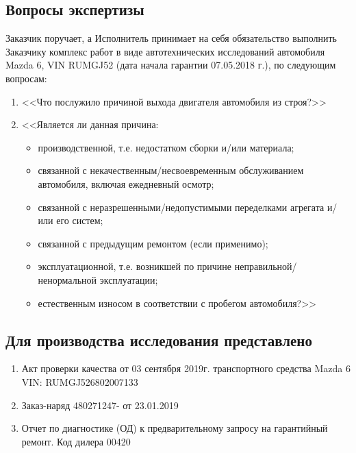 \setcounter{page}{1}

%
%
\subsection{Вопросы экспертизы}
Заказчик поручает, а Исполнитель принимает на себя обязательство выполнить Заказчику  комплекс работ в виде автотехнических исследований автомобиля Mazda 6, VIN RUMGJ52 (дата начала гарантии 07.05.2018 г.), по следующим вопросам:
\begin{enumerate}\item  <<Что послужило причиной выхода двигателя автомобиля из строя?>>	
	\item  <<Является ли данная причина:\begin{itemize}
		\item производственной, т.е. недостатком сборки и/или материала;
	\item связанной с некачественным/несвоевременным обслуживанием автомобиля, включая ежедневный осмотр;
\item связанной с неразрешенными/недопустимыми переделками агрегата и/или его систем;
\item связанной с предыдущим ремонтом (если применимо);
\item эксплуатационной, т.е. возникшей по причине неправильной/ненормальной эксплуатации;
\item  естественным износом в соответствии с пробегом автомобиля?>> 
	\end{itemize}
%	
\end{enumerate}
\subsection{Для производства исследования представлено} %
\begin{enumerate}
	\item Акт проверки качества от 03 сентября 2019г. транспортного средства Mazda 6 VIN: RUMGJ526802007133 
	\item  Заказ-наряд 480271247- от 23.01.2019
	\item Отчет по диагностике (ОД) к предварительному запросу на гарантийный ремонт. Код дилера 00420
	\end{enumerate}
%
%
%


